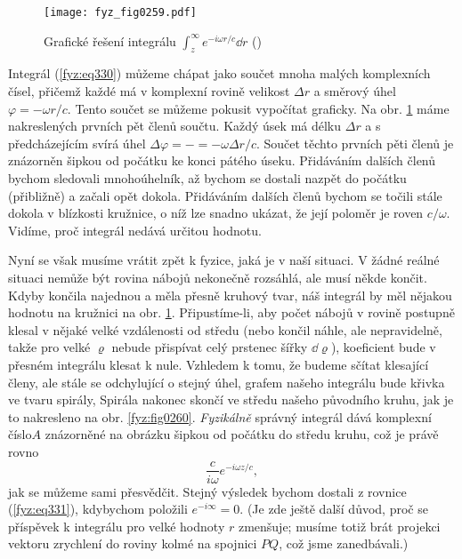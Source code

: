     \begin{figure}[ht!] %
      \centering
      \texttt{[image: fyz\_fig0259.pdf]}
      \caption{Grafické řešení integrálu \(\int_z^\infty e^{-i\omega r/c}\dd{r}\)
               (\cite[s.~406]{Feynman01})}
      \label{fyz:fig0259}
    \end{figure}
    
    Integrál (\ref{fyz:eq330}) můžeme chápat jako součet mnoha malých komplexních čísel, přičemž 
    každé má v komplexní rovině velikost \(\Delta r\) a směrový úhel \(\varphi = - \omega r/c\). 
    Tento součet se můžeme pokusit vypočítat graficky. Na obr. \ref{fyz:fig0259} máme nakreslených 
    prvních pět členů součtu. Každý úsek má délku \(\Delta r\) a s předcházejícím svírá úhel 
    \(\Delta\varphi = -= - \omega\Delta r/c\). Součet těchto prvních pěti členů je znázorněn šipkou 
    od počátku ke konci pátého úseku. Přidáváním dalších členů bychom sledovali mnohoúhelník, až 
    bychom se dostali nazpět do počátku (přibližně) a začali opět dokola. Přidáváním dalších členů 
    bychom se točili stále dokola v blízkosti kružnice, o níž lze snadno ukázat, že její poloměr je 
    roven \(c/\omega\). Vidíme, proč integrál nedává určitou hodnotu. 
    
    Nyní se však musíme vrátit zpět k fyzice, jaká je v naší situaci. V žádné reálné situaci nemůže 
    být rovina nábojů nekonečně rozsáhlá, ale musí někde končit. Kdyby končila najednou a měla 
    přesně kruhový tvar, náš integrál by měl nějakou hodnotu na kružnici na obr. \ref{fyz:fig0259}. 
    Připustíme-li, aby počet nábojů v rovině postupně klesal v nějaké velké vzdálenosti od středu 
    (nebo končil náhle, ale nepravidelně, takže pro velké \(\varrho\) nebude přispívat celý 
    prstenec šířky \(\dd{\varrho}\)), koeficient bude v přesném integrálu klesat k nule. Vzhledem k 
    tomu, že budeme sčítat klesající členy, ale stále se odchylující o stejný úhel, grafem našeho 
    integrálu bude křivka ve tvaru spirály, Spirála nakonec skončí ve středu našeho původního 
    kruhu, jak je to nakresleno na obr. \ref{fyz:fig0260}. \emph{Fyzikálně} správný integrál dává 
    komplexní číslo\(A\) znázorněné na obrázku šipkou od počátku do středu kruhu, což je právě 
    rovno
    \begin{equation}\label{fyz:eq332}
      \frac{c}{i\omega}e^{-i\omega z/c},
    \end{equation}
    jak se můžeme sami přesvědčit. Stejný výsledek bychom dostali z rovnice (\ref{fyz:eq331}), 
    kdybychom položili \(e^{-i\infty} = 0\). (Je zde ještě další důvod, proč se příspěvek k 
    integrálu pro velké hodnoty \(r\) zmenšuje; musíme totiž brát projekci vektoru zrychlení do 
    roviny kolmé na spojnici \(PQ\), což jsme zanedbávali.)
    
